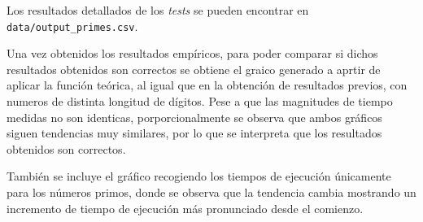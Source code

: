\begin{figure}[H]
\end{figure}
Los resultados detallados de los \textit{tests} se pueden encontrar en \texttt{data/output\_primes.csv}.

Una vez obtenidos los resultados empíricos, para poder comparar si dichos resultados obtenidos son correctos se obtiene el graico generado a aprtir de aplicar la función teórica, al igual que en la obtención de resultados previos, con numeros de distinta longitud de dígitos. Pese a que las magnitudes de tiempo medidas no son identicas, porporcionalmente se observa que ambos gráficos siguen tendencias muy similares, por lo que se interpreta que los resultados obtenidos son correctos.

\begin{figure}[H]
\end{figure}

También se incluye el gráfico recogiendo los tiempos de ejecución únicamente para los números primos, donde se observa que la tendencia cambia mostrando un incremento de tiempo de ejecución más pronunciado desde el comienzo.
\begin{figure}[H]
\end{figure}

